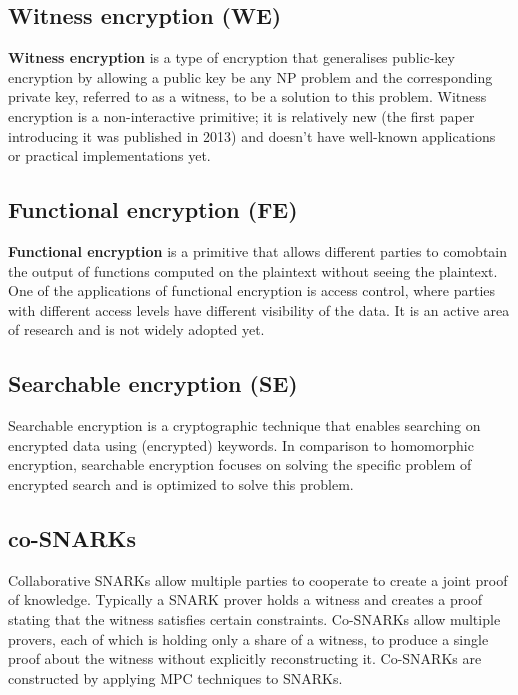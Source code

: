 \documentclass[final]{msc}
\begin{document}
\subsection{Witness encryption (WE)}

\textbf{Witness encryption} \cite{we} is a type of encryption that generalises public-key encryption by allowing a public key be any NP problem and the corresponding private key, referred to as a witness, to be a solution to this problem. Witness encryption is a non-interactive primitive; it is relatively new (the first paper introducing it was published in 2013) and doesn't have well-known applications or practical implementations yet.

\subsection{Functional encryption (FE)}

\textbf{Functional encryption} \cite{fe} is a primitive that allows different parties to comobtain the output of functions computed on the plaintext without seeing the plaintext. One of the applications of functional encryption is access control, where parties with different access levels have different visibility of the data. It is an active area of research and is not widely adopted yet.


\subsection{Searchable encryption (SE)}

Searchable encryption \cite{se} is a cryptographic technique that enables searching on encrypted data using (encrypted) keywords. In comparison to homomorphic encryption, searchable encryption focuses on solving the specific problem of encrypted search and is optimized to solve this problem.


\subsection{co-SNARKs}

Collaborative SNARKs \cite{cosnarks} allow multiple parties to cooperate to create a joint proof of knowledge. Typically a SNARK prover holds a witness and creates a proof stating that the witness satisfies certain constraints. Co-SNARKs allow multiple provers, each of which is holding only a share of a witness, to produce a single proof about the witness without explicitly reconstructing it. Co-SNARKs are constructed by applying MPC techniques to SNARKs.
\end{document}
